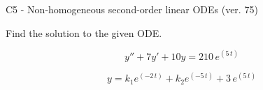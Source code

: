 \begin{exercise}
  \begin{exerciseTitle}C5 - Non-homogeneous second-order linear ODEs (ver. 75)\end{exerciseTitle}
  \begin{exerciseStatement}
    
Find the solution to the given ODE.

    
\[y''+7y'+10y = 210 \, e^{\left(5 \, t\right)}\]

  \end{exerciseStatement}
  \begin{exerciseAnswer}
    
\[y= k_{1} e^{\left(-2 \, t\right)} + k_{2} e^{\left(-5 \, t\right)} + 3 \, e^{\left(5 \, t\right)}\]

  \end{exerciseAnswer}
\end{exercise}